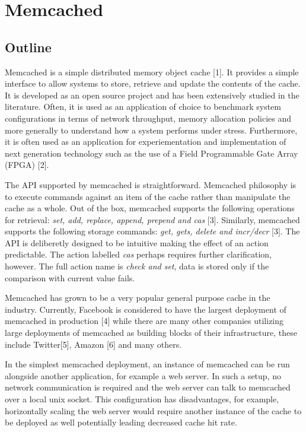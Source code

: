 \section{Memcached}\label{memcached}

\subsection{Outline}\label{outline}

Memcached is a simple distributed memory object cache {[}1{]}. It
provides a simple interface to allow systems to store, retrieve and
update the contents of the cache. It is developed as an open source
project and has been extensively studied in the literature. Often, it is
used as an application of choice to benchmark system configurations in
terms of network throughput, memory allocation policies and more
generally to understand how a system performs under stress. Furthermore,
it is often used as an application for experiementation and
implementation of next generation technology such as the use of a Field
Programmable Gate Array (FPGA) {[}2{]}.

The API supported by memcached is straightforward. Memcached philosophy
is to execute commands against an item of the cache rather than
manipulate the cache as a whole. Out of the box, memcached supports the
following operations for retrieval: \emph{set, add, replace, append,
prepend and cas} {[}3{]}. Similarly, memcached supports the following
storage commands: \emph{get, gets, delete and incr/decr} {[}3{]}. The
API is deliberetly designed to be intuitive making the effect of an
action predictable. The action labelled \emph{cas} perhaps requires
further clarification, however. The full action name is \emph{check and
set}, data is stored only if the comparison with current value fails.

Memcached has grown to be a very popular general purpose cache in the
industry. Currently, Facebook is considered to have the largest
deployment of memcached in production {[}4{]} while there are many other
companies utilizing large deployments of memcached as building blocks of
their infrastructure, these include Twitter{[}5{]}, Amazon {[}6{]} and
many others.

In the simplest memcached deployment, an instance of memcached can be
run alongside another application, for example a web server. In such a
setup, no network communication is required and the web server can talk
to memcached over a local unix socket. This configuration has
disadvantages, for example, horizontally scaling the web server would
require another instance of the cache to be deployed as well potentially
leading decreased cache hit rate.


